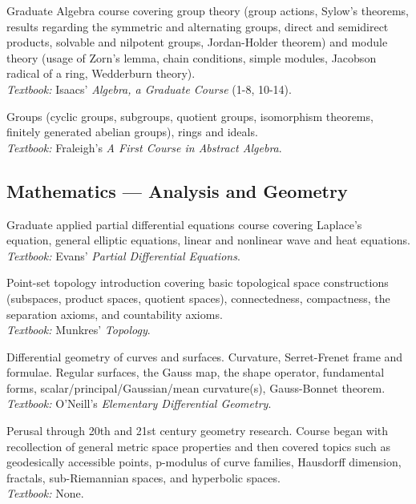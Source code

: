 \documentclass[11pt,letterpaper,sans]{moderncv}
\begin{document}
%
  {Graduate Algebra course covering group theory (group actions, Sylow's theorems, results regarding the symmetric and alternating groups, direct and semidirect products, solvable and nilpotent groups, Jordan-Holder theorem) and module theory (usage of Zorn's lemma, chain conditions, simple modules, Jacobson radical of a ring, Wedderburn theory). \\ \emph{Textbook: }Isaacs' \emph{Algebra, a Graduate Course} (1-8, 10-14).}

%
  {Groups (cyclic groups, subgroups, quotient groups, isomorphism theorems, finitely generated abelian groups), rings and ideals. \\ \emph{Textbook: }Fraleigh's \emph{A First Course in Abstract Algebra}.}



\subsection{Mathematics --- Analysis and Geometry}

%
  {Graduate applied partial differential equations course covering Laplace's equation, general elliptic equations, linear and nonlinear wave and heat equations. \\ \emph{Textbook: }Evans' \emph{Partial Differential Equations}.}

%
  {Point-set topology introduction covering basic topological space constructions (subspaces, product spaces, quotient spaces), connectedness, compactness, the separation axioms, and countability axioms. \\ \emph{Textbook: }Munkres' \emph{Topology}.}

%
  {Differential geometry of curves and surfaces. Curvature, Serret-Frenet frame and formulae. Regular surfaces, the Gauss map, the shape operator, fundamental forms, scalar/principal/Gaussian/mean curvature(s), Gauss-Bonnet theorem. \\ \emph{Textbook: }O'Neill's \emph{Elementary Differential Geometry}.}

%
  {Perusal through 20th and 21st century geometry research. Course began with recollection of general metric space properties and then covered topics such as geodesically accessible points, p-modulus of curve families, Hausdorff dimension, fractals, sub-Riemannian spaces, and hyperbolic spaces.  \\ \emph{Textbook: }None.}
\end{document}
